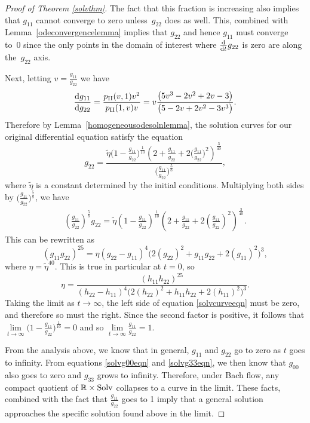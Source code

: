 \documentclass[10pt,a4paper]{amsart}
\numberwithin{equation}{section}
\newcommand{\dtime}{\frac{{\rm d}}{{\rm d} t}} %
\begin{document}
\begin{proof}[Proof of Theorem \ref{solvthm}]
The fact that this fraction is increasing also implies that $g_{11}$ cannot converge to zero unless~$g_{22}$ does as well. This, combined with Lemma~\ref{odeconvergencelemma} implies that $g_{22}$ and hence $g_{11}$ must converge to~0 since the only points in the domain of interest where $\dtime g_{22}$ is zero are along the~$g_{22}$ axis.

Next, letting $v = \frac{g_{11}}{g_{22}}$ we have
\begin{gather*}
\frac{{\rm d} g_{11}}{{\rm d} g_{22}} = \frac{p_{\rm II}(v, 1) v^2}{p_{\rm II}(1, v) v}
		 = v \frac{\big(5v^3 - 2v^2 + 2v- 3\big)}{\big(5 - 2v + 2v^2 - 3v^3\big)}.
\end{gather*}
Therefore by Lemma~\ref{homogeneousodesolnlemma}, the solution curves for our original differential equation satisfy the equation
\[
g_{22} = \frac{\tilde{\eta} \big(1-\frac{g_{11}}{g_{22}}\big)^{\frac{1}{10}}
		\left(2 + \frac{g_{11}}{g_{22}} + 2\big(\frac{g_{11}}{g_{22}}\big)^2\right)^{\frac{3}{40}}}				{\big(\frac{g_{11}}{g_{22}}\big)^{\frac{5}{8}}},
\]
where $\tilde{\eta}$ is a constant determined by the initial conditions.
Multiplying both sides by $\big(\frac{g_{11}}{g_{22}}\big)^{\frac{5}{8}}$, we have
\begin{gather} \label{solvcurveeqn}
\left(\frac{g_{11}}{g_{22}}\right)^{\frac{5}{8}} g_{22}
		= \tilde{\eta} \left(1-\frac{g_{11}}{g_{22}}\right)^{\frac{1}{10}}
		\left(2 + \frac{g_{11}}{g_{22}} + 2\left(\frac{g_{11}}{g_{22}}\right)^2\right)^{\frac{3}{40}}.
\end{gather}
This can be rewritten as
\begin{equation*}
(g_{11} g_{22})^{25} = \eta (g_{22}-g_{11})^{4} \big(2(g_{22})^2 + g_{11} g_{22} + 2(g_{11})^2\big)^{3},
\end{equation*}
where $\eta = \tilde{\eta}^{40}$. This is true in particular at $t = 0$, so
\[
\eta = \frac{(h_{11} h_{22})^{25}}{(h_{22}-h_{11})^{4}
				\big(2(h_{22})^2 + h_{11} h_{22} + 2(h_{11})^2\big)^{3}}.
\]
Taking the limit as $t \rightarrow \infty$, the left side of equation \eqref{solvcurveeqn} must be zero, and therefore so must the right. Since the second factor is positive, it follows that $\lim\limits_{t \rightarrow \infty}\big(1-\frac{g_{11}}{g_{22}}\big)^{\frac{1}{10}} = 0$ and so $\lim\limits_{t \rightarrow \infty} \frac{g_{11}}{g_{22}} = 1$.

From the analysis above, we know that in general, $g_{11}$ and $g_{22}$ go to zero as $t$ goes to infinity. From equations \eqref{solvg00eqn} and \eqref{solvg33eqn}, we then know that $g_{00}$ also goes to zero and $g_{33}$ grows to infinity. Therefore, under Bach flow, any compact quotient of $\mathbb{R} \times {\rm Solv}$ collapses to a curve in the limit. These facts, combined with the fact that $\frac{g_{11}}{g_{22}}$ goes to 1 imply that a general solution approaches the specific solution found above in the limit.
\end{proof}
\end{document}
